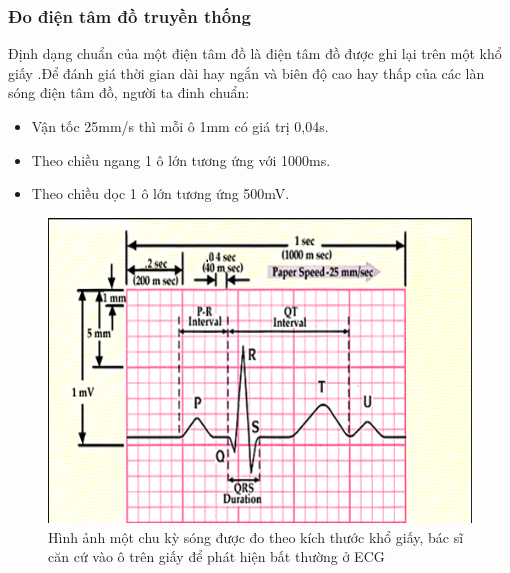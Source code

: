 \subsubsection{Đo điện tâm đồ truyền thống}
Định dạng chuẩn của một điện tâm đồ là điện tâm đồ được ghi lại trên một khổ giấy
.Để đánh giá thời gian dài hay ngắn và biên độ cao hay thấp của các làn sóng điện tâm đồ, người ta đinh chuẩn: 
\begin{itemize}
    \item Vận tốc 25mm/s thì mỗi ô 1mm có giá trị 0,04s.
    \item Theo chiều ngang 1 ô lớn tương ứng với 1000ms.
    \item Theo chiều dọc 1 ô lớn tương ứng 500mV.
\end{itemize}
\begin{center}
    \begin{figure}[htp]
    \begin{center}
    \includegraphics[scale=.6]{image/week1/new_ecg_paper.png}
    \end{center}
    \caption[Hình ảnh một chu kỳ sóng]{Hình ảnh một chu kỳ sóng được đo theo kích thước khổ giấy, bác sĩ căn cứ vào ô trên giấy để phát hiện bất thường ở ECG \cite{ecggiay}}
    \end{figure}
\end{center}
